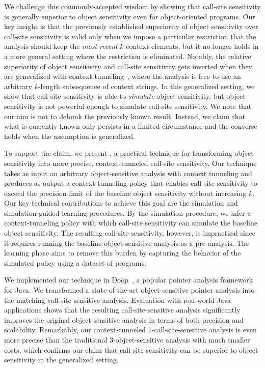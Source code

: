 We challenge this commonly-accepted wisdom by showing that call-site
sensitivity is generally superior to object sensitivity %
even for object-oriented programs.  Our key insight
is that the previously established superiority of object sensitivity over
call-site sensitivity is valid only when we impose a particular restriction that
the analysis should keep the {\em most recent} $k$ context elements,
but it no longer holds in a more general setting where the restriction
is eliminated. Notably, the relative superiority of object sensitivity
and call-site sensitivity gets inverted when they are generalized with
context tunneling~\cite{JeJeOh18}, where the analysis is free to use
an arbitrary $k$-length subsequence of context strings.  In this
generalized setting, we show that call-site sensitivity is able to {\em
  simulate} object sensitivity, but object sensitivity is not powerful
enough to simulate call-site sensitivity.
We note that our aim is not to debunk the previously known result. Instead, we claim that what is currently known only persists in a limited circumstance and the converse holds when the assumption is generalized. 


To support the claim, %
we present \ourtechnique, a practical technique for transforming
object sensitivity into more precise,
context-tunneled call-site sensitivity.  Our technique takes as input
an arbitrary object-sensitive analysis with context tunneling and produces as output a
context-tunneling policy that enables call-site sensitivity to exceed
the precision limit of the baseline object sensitivity without
increasing $k$. Our key technical contributions to achieve this goal are the simulation and
simulation-guided learning procedures.  By the simulation procedure, we infer a context-tunneling policy
with which call-site sensitivity can simulate the baseline object
sensitivity.  The resulting call-site sensitivity, however,  is 
impractical since it requires running the baseline object-sensitive
analysis as a pre-analysis.  The learning phase aims to remove
this burden by capturing the behavior of the simulated policy using
a dataset of programs.


We implemented our technique in
Doop~\cite{BravenboerS09}, a popular pointer analysis framework for
Java.
We transformed a state-of-the-art object-sensitive pointer analysis
into the matching call-site-sensitive analysis. 
Evaluation with
real-world Java applications shows that the resulting call-site-sensitive analysis 
 significantly improves the original object-sensitive analysis in terms of both precision and scalability. 
Remarkably, our context-tunneled 1-call-site-sensitive
analysis is even more precise than the traditional 3-object-sensitive
analysis with much smaller costs,  which confirms our claim that call-site sensitivity can be superior to object sensitivity in the generalized setting. 

